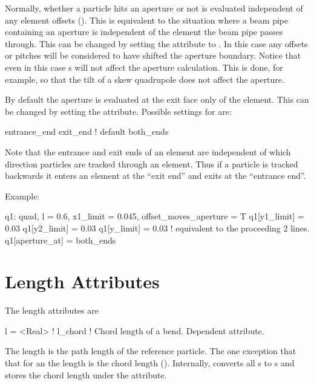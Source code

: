Normally, whether a particle hits an aperture or not is evaluated
independent of any element offsets (). This is equivalent
to the situation where a beam pipe containing an aperture is
independent of the element the beam pipe passes through. This can be
changed by setting the  attribute to
. In this case any offsets or pitches will be considered to
have shifted the aperture boundary. Notice that even in this case
s will not affect the aperture calculation. This is done, for
example, so that the tilt of a skew quadrupole does not affect the
aperture.

By default the aperture is evaluated at the exit face only of the
element. This can be changed by setting the  attribute.
Possible settings for  are:
\begin{example}
  entrance_end
  exit_end  ! default
  both_ends
\end{example}
Note that the entrance and exit ends of an element are independent of
which direction particles are tracked through an element. Thus if a
particle is tracked backwards it enters an element at the ``exit end''
and exits at the ``entrance end''.

Example:
\begin{example}
  q1: quad, l = 0.6, x1_limit = 0.045, offset_moves_aperture = T
  q1[y1_limit] = 0.03
  q1[y2_limit] = 0.03
  q1[y_limit] = 0.03  ! equivalent to the proceeding 2 lines.  
  q1[aperture_at] = both_ends
\end{example}

\section{Length Attributes}
\label{s:l}

The length attributes are
\begin{example}
  l       = <Real>  ! 
  l_chord           ! Chord length of a bend. Dependent attribute.
\end{example}
The length  is the path length of the reference
particle. The one exception that that for an  the length
 is the chord length (). Internally, \bmad converts
all s to s and stores the chord length
under the  attribute.

